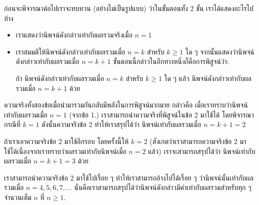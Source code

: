 ก่อน{\wbr}จะ{\wbr}พิจารณา{\wbr}ต่อไป{\wbr}เรา{\wbr}จะ{\wbr}ทบทวน (อย่าง{\wbr}ไม่{\wbr}เป็น{\wbr}รูปแบบ) ว่า{\wbr}ใน{\wbr}ขั้นตอน{\wbr}ทั้ง 2 ขั้น เรา{\wbr}ได้{\wbr}แสดง{\wbr}อะไร{\wbr}ไป{\wbr}บ้าง{\wbr}

\begin{itemize}
\item เรา{\wbr}แสดง{\wbr}ว่า{\wbr}นิพจน์{\wbr}ดังกล่าว{\wbr}เท่า{\wbr}กับ{\wbr}ผลรวม{\wbr}จริง{\wbr}เมื่อ $ n=1 $
\item เรา{\wbr}สมมติ{\wbr}ให้{\wbr}นิพจน์{\wbr}ดังกล่าว{\wbr}เท่า{\wbr}กับ{\wbr}ผลรวม{\wbr}เมื่อ $ n=k $ สำหรับ $ k\geq 1 $ ใด ๆ จากนั้น{\wbr}แสดง{\wbr}ว่า{\wbr}นิพจน์{\wbr}ดังกล่าว{\wbr}เท่า{\wbr}กับ{\wbr}ผลรวม{\wbr}เมื่อ $ n=k+1 $ ขั้นตอน{\wbr}นี้{\wbr}กล่าว{\wbr}ใน{\wbr}อีก{\wbr}ทาง{\wbr}หนึ่ง{\wbr}ก็{\wbr}คือ{\wbr}การ{\wbr}พิสูจน์{\wbr}ว่า:

ถ้า นิพจน์{\wbr}ดังกล่าว{\wbr}เท่า{\wbr}กับ{\wbr}ผลรวม{\wbr}เมื่อ $ n=k $ สำหรับ $ k\geq 1 $ ใด ๆ แล้ว นิพจน์{\wbr}ดังกล่าว{\wbr}เท่า{\wbr}กับ{\wbr}ผลรวม{\wbr}เมื่อ $ n=k+1 $ ด้วย{\wbr}
\end{itemize}

ความจริง{\wbr}ทั้ง{\wbr}สอง{\wbr}ข้อ{\wbr}เมื่อ{\wbr}นำมา{\wbr}รวม{\wbr}กัน{\wbr}กลับ{\wbr}มี{\wbr}พลัง{\wbr}ใน{\wbr}การ{\wbr}พิสูจน์{\wbr}มากมาย กล่าวคือ{\wbr}
เมื่อ{\wbr}เรา{\wbr}ทราบ{\wbr}ว่า{\wbr}นิพจน์{\wbr}เท่า{\wbr}กับ{\wbr}ผลรวม{\wbr}เมื่อ $ n=1 $ (จาก{\wbr}ข้อ 1.)
เรา{\wbr}สามารถ{\wbr}นำ{\wbr}ความจริง{\wbr}ที่{\wbr}พิสูจน์{\wbr}ใน{\wbr}ข้อ 2 มา{\wbr}ใช้ได้ โดย{\wbr}พิจารณา{\wbr}กรณี{\wbr}ที่ $ k=1 $
ดังนั้น{\wbr}ความจริง{\wbr}ข้อ 2 ทำ{\wbr}ให้{\wbr}เรา{\wbr}สรุป{\wbr}ได้{\wbr}ว่า นิพจน์{\wbr}เท่า{\wbr}กับ{\wbr}ผลรวม{\wbr}เมื่อ $ n=k+1=2 $

ถ้า{\wbr}เรา{\wbr}เอา{\wbr}ความจริง{\wbr}ข้อ 2 มา{\wbr}ใช้{\wbr}อีก{\wbr}รอบ โดย{\wbr}ครั้งนี้{\wbr}ให้ $ k=2 $
(สังเกต{\wbr}ว่า{\wbr}เรา{\wbr}สามารถ{\wbr}ความจริง{\wbr}ข้อ 2 มา{\wbr}ใช้ได้{\wbr}เนื่องจาก{\wbr}เรา{\wbr}ทราบ{\wbr}ว่า{\wbr}ผลรวม{\wbr}เท่า{\wbr}กับ{\wbr}นิพจน์{\wbr}เมื่อ $
n=2 $ แล้ว) เรา{\wbr}จะ{\wbr}สามารถ{\wbr}สรุป{\wbr}ได้{\wbr}ว่า นิพจน์{\wbr}เท่า{\wbr}กับ{\wbr}ผลรวม{\wbr}เมื่อ $ n=k+1=3 $ ด้วย{\wbr}

เรา{\wbr}สามารถ{\wbr}นำ{\wbr}ความจริง{\wbr}ข้อ 2 มา{\wbr}ใช้{\wbr}ไป{\wbr}เรื่อย ๆ ทำ{\wbr}ให้{\wbr}เรา{\wbr}สามารถ{\wbr}อ้าง{\wbr}ไป{\wbr}ได้{\wbr}เรื่อย ๆ
ว่า{\wbr}นิพจน์{\wbr}นั้น{\wbr}เท่า{\wbr}กับ{\wbr}ผลรวม{\wbr}เมื่อ $ n=4,5,6,7,\ldots $
นั่น{\wbr}คือ{\wbr}เรา{\wbr}สามารถ{\wbr}สรุป{\wbr}ได้{\wbr}ว่า{\wbr}นิพจน์{\wbr}ดังกล่าว{\wbr}มี{\wbr}ค่า{\wbr}เท่า{\wbr}กับ{\wbr}ผลรวม{\wbr}สำหรับ{\wbr}ทุก ๆ จำนวนเต็ม $ n $ ที่{\wbr}
$ n\geq 1 $.

